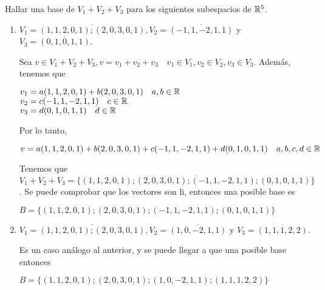 \item Hallar una base de $V_1+V_2+V_3$ para los siguientes subespacios de $\mathbb{R}^5$.
    \begin{enumerate}
        \item $V_1=\overline{(1,1,2,0,1);(2,0,3,0,1)}, V_2=\overline{(-1,1,-2,1,1)}$ y $V_3=\overline{(0,1,0,1,1)}$.
            \begin{mdframed}[style=s]
                Sea $v\in V_1+V_2+V_3,v=v_1+v_2+v_3\quad v_1\in V_1,v_2\in V_2,v_3\in V_3$. Además, tenemos que
                \begin{center}
                    $v_1=a(1,1,2,0,1)+b(2,0,3,0,1)\quad a,b\in\mathbb{R}$\\
                    $v_2=c(-1,1,-2,1,1)\quad c\in\mathbb{R}$\\
                    $v_3=d(0,1,0,1,1)\quad d\in\mathbb{R}$
                \end{center}
                Por lo tanto,
                \begin{center}
                    $v=a(1,1,2,0,1)+b(2,0,3,0,1)+c(-1,1,-2,1,1)+d(0,1,0,1,1)\quad a,b,c,d\in\mathbb{R}$
                \end{center}
                Tenemos que $V_1+V_2+V_3=\overline{\{(1,1,2,0,1);(2,0,3,0,1);(-1,1,-2,1,1);(0,1,0,1,1)\}}$. Se puede comprobar que los vectores son li, entonces una posible base es
                \begin{center}
                    $B=\{(1,1,2,0,1);(2,0,3,0,1);(-1,1,-2,1,1);(0,1,0,1,1)\}$
                \end{center}
            \end{mdframed}
        \item $V_1=\overline{(1,1,2,0,1);(2,0,3,0,1)}, V_2=\overline{(1,0,-2,1,1)}$ y $V_3=\overline{(1,1,1,2,2)}$.
            \begin{mdframed}[style=s]
                Es un caso análogo al anterior, y se puede llegar a que una posible base entonces
                \begin{center}
                    $B=\{(1,1,2,0,1);(2,0,3,0,1);(1,0,-2,1,1);(1,1,1,2,2)\}$
                \end{center}
            \end{mdframed}
    \end{enumerate}